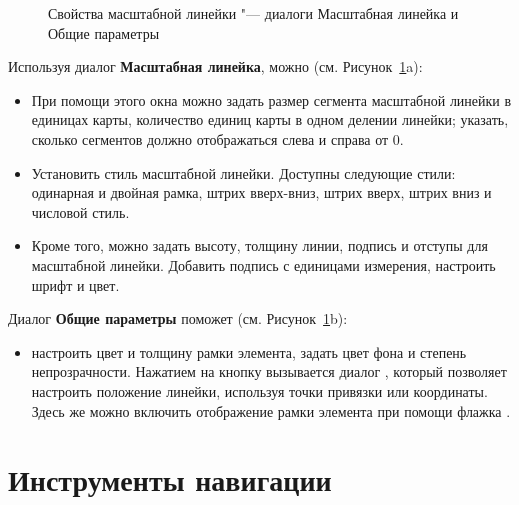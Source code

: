 \begin{figure}[ht]
\centering
{}
\hspace{1cm}
\caption{Свойства масштабной линейки "--- диалоги Масштабная линейка и Общие параметры \wincaption}\label{fig:scalebaroptions}
\end{figure}


Используя диалог \textbf{Масштабная линейка}, можно
(см. Рисунок~\ref{fig:scalebaroptions}a):

\begin{itemize}[label=--]
\item При помощи этого окна можно задать размер сегмента масштабной
линейки в единицах карты, количество единиц карты в одном делении
линейки; указать, сколько сегментов должно отображаться слева и справа
от 0.
\item Установить стиль масштабной линейки. Доступны следующие стили:
одинарная и двойная рамка, штрих вверх-вниз, штрих вверх, штрих вниз и
числовой стиль.
\item Кроме того, можно задать высоту, толщину линии, подпись и отступы
для масштабной линейки. Добавить подпись с единицами измерения, настроить
шрифт и цвет.
\end{itemize}


Диалог \textbf{Общие параметры} поможет (см. Рисунок~\ref{fig:scalebaroptions}b):

\begin{itemize}[label=--]
\item настроить цвет и толщину рамки элемента, задать цвет фона и
степень непрозрачности. Нажатием на кнопку 
вызывается диалог , который позволяет
настроить положение линейки, используя точки привязки или координаты.
Здесь же можно включить отображение рамки элемента при помощи флажка
.
\end{itemize}

\section{Инструменты навигации}

